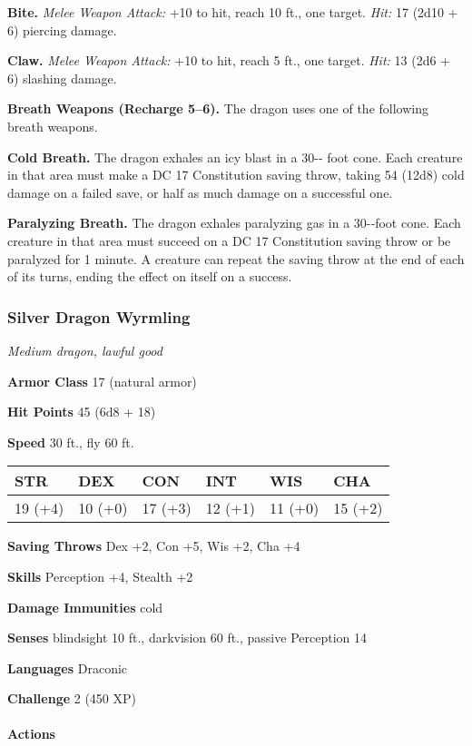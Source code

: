 \documentclass[
]{article}
\begin{document}
\textbf{Bite.} \emph{Melee Weapon Attack:} +10 to hit, reach 10 ft., one
target. \emph{Hit:} 17 (2d10 + 6) piercing damage.

\textbf{Claw.} \emph{Melee Weapon Attack:} +10 to hit, reach 5 ft., one
target. \emph{Hit:} 13 (2d6 + 6) slashing damage.

\textbf{Breath Weapons (Recharge 5--6).} The dragon uses one of the
following breath weapons.

\textbf{Cold Breath.} The dragon exhales an icy blast in a 30-­‐ foot
cone. Each creature in that area must make a DC 17 Constitution saving
throw, taking 54 (12d8) cold damage on a failed save, or half as much
damage on a successful one.

\textbf{Paralyzing Breath.} The dragon exhales paralyzing gas in a
30-­‐foot cone. Each creature in that area must succeed on a DC 17
Constitution saving throw or be paralyzed for 1 minute. A creature can
repeat the saving throw at the end of each of its turns, ending the
effect on itself on a success.

\hypertarget{silver-dragon-wyrmling}{%
\subsubsection{Silver Dragon Wyrmling}\label{silver-dragon-wyrmling}}

\emph{Medium dragon, lawful good}

\textbf{Armor Class} 17 (natural armor)

\textbf{Hit Points} 45 (6d8 + 18)

\textbf{Speed} 30 ft., fly 60 ft.

\begin{longtable}[]{@{}llllll@{}}
\toprule
STR & DEX & CON & INT & WIS & CHA\tabularnewline
\midrule
\endhead
19 (+4) & 10 (+0) & 17 (+3) & 12 (+1) & 11 (+0) & 15 (+2)\tabularnewline
\bottomrule
\end{longtable}

\textbf{Saving Throws} Dex +2, Con +5, Wis +2, Cha +4

\textbf{Skills} Perception +4, Stealth +2

\textbf{Damage Immunities} cold

\textbf{Senses} blindsight 10 ft., darkvision 60 ft., passive Perception
14

\textbf{Languages} Draconic

\textbf{Challenge} 2 (450 XP)

\hypertarget{actions-62}{%
\paragraph{Actions}\label{actions-62}}
\end{document}

